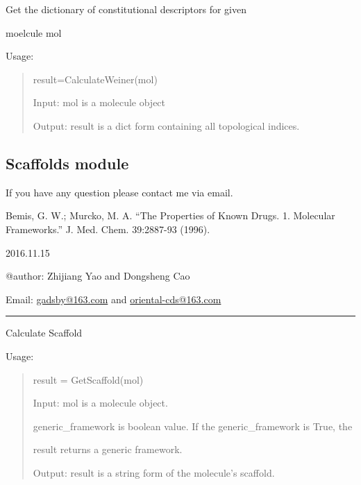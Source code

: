 \documentclass[letterpaper,10pt,english]{sphinxmanual}
\begin{document}

\begin{fulllineitems}
\label{reference/topology:topology.GetTopology}
Get the dictionary of constitutional descriptors for given

moelcule mol

Usage:
\begin{quote}

result=CalculateWeiner(mol)

Input: mol is a molecule object

Output: result is a dict form containing all topological indices.
\end{quote}

\end{fulllineitems}



\subsection{Scaffolds module}
\label{reference/Scaffolds::doc}\label{reference/Scaffolds:scaffolds-module}\label{reference/Scaffolds:module-Scaffolds}
If you have any question please contact me via email.

Bemis, G. W.; Murcko, M. A. “The Properties of Known Drugs. 1. Molecular Frameworks.” 
J. Med. Chem. 39:2887-93 (1996).

2016.11.15

@author: Zhijiang Yao and Dongsheng Cao

Email: \href{mailto:gadsby@163.com}{gadsby@163.com} and \href{mailto:oriental-cds@163.com}{oriental-cds@163.com}


\bigskip\hrule{}\bigskip


\begin{fulllineitems}
\label{reference/Scaffolds:Scaffolds.GetScaffold}
Calculate Scaffold

Usage:
\begin{quote}

result = GetScaffold(mol)

Input: mol is a molecule object.

generic\_framework is boolean value. If the generic\_framework is True, the

result returns a generic framework.

Output: result is a string form of the molecule's scaffold.
\end{quote}

\end{fulllineitems}
\end{document}
